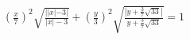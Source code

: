 \documentclass[preview]{standalone}
\begin{document}
\begin{align*}
\left(\frac{x}{7}\right)^2 \sqrt{\frac{||x|-3|}{|x|-3}} + \left(\frac{y}{3}\right)^2 \sqrt{\frac{|y + \frac{3}{7}\sqrt{33}|}{y + \frac{3}{7}\sqrt{33}}} = 1
\end{align*}
\end{document}
